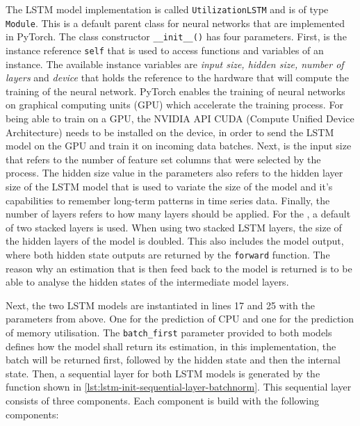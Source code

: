   The LSTM model implementation is called \texttt{UtilizationLSTM} and is of type \texttt{Module}. This is a default parent class for neural networks that are implemented in PyTorch.
  The class constructor \texttt{\_\_init\_\_()} has four parameters. First, is the instance reference \texttt{self} that is used to access functions and variables of an instance. 
  The available instance variables are \emph{input size, hidden size, number of layers} and \emph{device} that holds the reference to the hardware that will compute the training of the neural network.
  PyTorch enables the training of neural networks on graphical computing units (GPU) which accelerate the training process. For being able to train on a GPU, the NVIDIA API CUDA (Compute Unified Device Architecture) needs to be installed on the device, in order to send the LSTM model on the GPU and train it on incoming data batches. 
  Next, is the input size that refers to the number of feature set columns that were selected by the  process.
  The hidden size value in the parameters also refers to the hidden layer size of the LSTM model that is used to variate the size of the model and it's capabilities to remember long-term patterns in time series data.
  Finally, the number of layers refers to how many  layers should be applied.
  For the , a default of two stacked layers is used. When using two stacked LSTM layers, the size of the hidden layers of the model is doubled. This also includes the model output, where both hidden state outputs are returned by the \texttt{forward} function.
  The reason why an estimation that is then feed back to the model is returned is to be able to analyse the hidden states of the intermediate model layers.
  
  Next, the two LSTM models are instantiated in lines 17 and 25 with the parameters from above. One for the prediction of CPU and one for the prediction of memory utilisation. The \texttt{batch\_first} parameter provided to both models defines how the model shall return its estimation, in this implementation, the batch will be returned first, followed by the hidden state and then the internal state.
  Then, a sequential layer for both LSTM models is generated by the function shown in \ref{lst:lstm-init-sequential-layer-batchnorm}. This sequential layer consists of three components. Each component is build with the following components:
  
